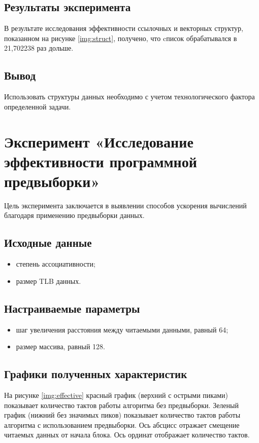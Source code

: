 \section{Результаты эксперимента}

В результате исследования эффективности ссылочных и векторных структур, показанном на рисунке \ref{img:struct}, получено, что cписок обрабатывался в 21,702238 раз дольше.

\section{Вывод}

Использовать структуры данных необходимо с учетом технологического фактора определенной задачи.

\chapter{Эксперимент «Исследование эффективности программной предвыборки»}

Цель эксперимента заключается в выявлении способов ускорения
вычислений благодаря применению предвыборки данных.

\section{Исходные данные}

\begin{itemize}
	\item степень ассоциативности;
	\item размер TLB данных.
\end{itemize}

\section{Настраиваемые параметры}

\begin{itemize}
	\item шаг увеличения расстояния между читаемыми данными, равный 64;
	\item размер массива, равный 128.
\end{itemize}

\section{Графики полученных характеристик}

На рисунке \ref{img:effective} красный график (верхний с острыми пиками) показывает количество тактов работы алгоритма без предвыборки. Зеленый график (нижний без значимых пиков) показывает количество тактов работы алгоритма с использованием
предвыборки. Ось абсцисс отражает смещение читаемых данных от начала блока. Ось ординат отображает количество тактов.


